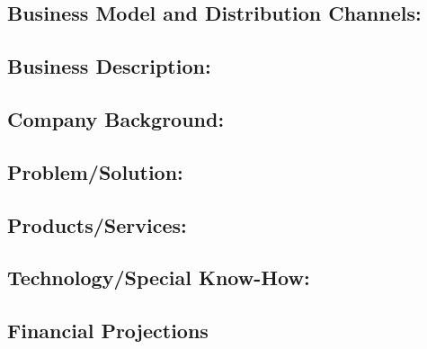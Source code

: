 \begin{multicols}{2}
\begin{minipage}{.48\textwidth}
	\subsection*{Business Model and Distribution Channels:}

	\end{minipage}
	\hfill\begin{minipage}{.5\textwidth}
		\subsection*{Business Description:}
		\subsection*{Company Background:}
		\subsection*{Problem/Solution:}
		\subsection*{Products/Services:}
		\subsection*{Technology/Special Know-How:}


		\subsection*{Financial Projections}
		\begin{figure}[H]
			
			\label{fig:forecast}
		\end{figure}
		
	\end{minipage}
	
\end{multicols}